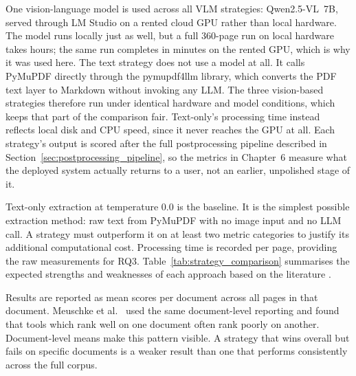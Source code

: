One vision-language model is used across all VLM strategies:
Qwen2.5-VL~7B, served through LM Studio on a rented cloud GPU rather than
local hardware. The model runs locally just as well, but a full 360-page
run on local hardware takes hours; the same run completes in minutes on
the rented GPU, which is why it was used here. The text strategy does not
use a model at all. It calls
PyMuPDF directly through the pymupdf4llm library, which converts the PDF
text layer to Markdown without invoking any LLM. The three vision-based
strategies therefore run under identical hardware and model conditions,
which keeps that part of the comparison fair. Text-only's processing time
instead reflects local disk and CPU speed, since it never reaches the GPU
at all. Each strategy's output is scored after the full postprocessing
pipeline described in Section~\ref{sec:postprocessing_pipeline}, so the
metrics in Chapter~6 measure what the deployed system actually returns to
a user, not an earlier, unpolished stage of it.

Text-only extraction at temperature 0.0 is the baseline. It is the
simplest possible extraction method: raw text from PyMuPDF with no
image input and no LLM call. A strategy must outperform it on at least
two metric categories to justify its additional computational cost.
Processing time is recorded per page, providing the raw measurements
for RQ3. Table~\ref{tab:strategy_comparison}
summarises the expected strengths and weaknesses of each approach based on
the literature \autocite{meuschke2023, whitington2012}.

Results are reported as mean scores per document across all pages in that
document. Meuschke et al.\ \autocite{meuschke2023} used the same
document-level reporting and found that tools which rank well on one
document often rank poorly on another. Document-level means make this
pattern visible. A strategy that wins overall but fails on specific documents is a weaker
result than one that performs consistently across the full corpus.

